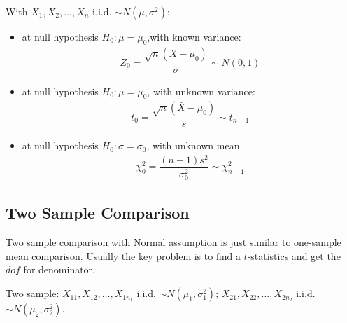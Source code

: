 With $ X_1,X_2,\ldots,X_n $ i.i.d. $ \sim N(\mu ,\sigma ^2) $:
\begin{itemize}[topsep=2pt,itemsep=0pt]
    \item at null hypothesis $ H_0: \mu =\mu _0 $,with known variance:
    \begin{align*}
        Z_0 = \dfrac{ \sqrt{n}(\bar{X}-\mu _0) }{ \sigma  }\sim N(0,1)  
    \end{align*}
    \item at null hypothesis $ H_0: \mu =\mu _0 $, with unknown variance:
    \begin{align*}
        t_0 =  \dfrac{ \sqrt{n}(\bar{X}-\mu _0) }{ s  }\sim t_{n-1}
    \end{align*}
    \item at null hypothesis $ H_0: \sigma =\sigma _0 $, with unknown mean
    \begin{align*}
        \chi_0^2 = \dfrac{ (n-1)s^2 }{ \sigma _0^2 }  \sim \chi^2_{n-1}
    \end{align*}   
\end{itemize}


\subsection{Two Sample Comparison}\label{SubSubSectionDoETwoSampleComparison}

Two sample comparison with Normal assumption is just similar to one-sample mean comparison. Usually the key problem is to find a $ t $-statistics and get the $ dof $ for denominator.

Two sample: $ X_{11},X_{12},\ldots,X_{1n_1} $ i.i.d. $ \sim N(\mu _1,\sigma _1^2) $; $ X_{21},X_{22},\ldots,X_{2n_2} $ i.i.d. $ \sim N(\mu _2,\sigma_2^2) $. 

